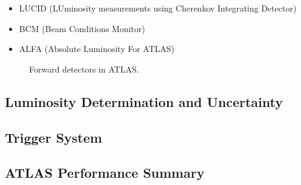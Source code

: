 \begin{itemize}
\item LUCID (LUminosity measurements using Cherenkov Integrating Detector)
\item BCM (Beam Conditions Monitor)
\item ALFA (Absolute Luminosity For ATLAS)
\end{itemize}

\begin{figure}[ht]
\centering
{}
\caption{Forward detectors in ATLAS.}
\label{fig:atlas:forward}
\end{figure}

\subsection{Luminosity Determination and Uncertainty}

\subsection{Trigger System}
\label{sec:cern:trigger}

\subsection{ATLAS Performance Summary}

